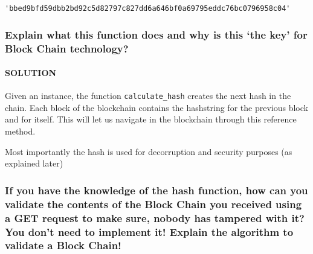\documentclass[11pt]{article}
\makeatletter
\newcommand{\boxspacing}{\kern\kvtcb@left@rule\kern\kvtcb@boxsep}
\newcommand{\prompt}[4]{
        {\ttfamily\llap{{\color{#2}[#3]:\hspace{3pt}#4}}\vspace{-\baselineskip}}
    }
\makeatother
\begin{document}
            \begin{tcolorbox}[breakable, size=fbox, boxrule=.5pt, pad at break*=1mm, opacityfill=0]
\prompt{Out}{outcolor}{35}{\boxspacing}
\begin{Verbatim}[commandchars=\\\{\}]
'bbed9bfd59dbb2bd92c5d82797c827dd6a646bf0a69795eddc76bc0796958c04'
\end{Verbatim}
\end{tcolorbox}
        
    \hypertarget{explain-what-this-function-does-and-why-is-this-the-key-for-block-chain-technology}{%
\subsubsection{Explain what this function does and why is this
`the key' for Block Chain
technology?}\label{explain-what-this-function-does-and-why-is-this-the-key-for-block-chain-technology}}

    \hypertarget{solution}{%
\paragraph{SOLUTION}\label{solution}}

Given an instance, the function \texttt{calculate\_hash} creates the
next hash in the chain. Each block of the blockchain contains the
hashstring for the previous block and for itself. This will let us
navigate in the blockchain through this reference method.

Most importantly the hash is used for decorruption and security purposes
(as explained later)

    \hypertarget{if-you-have-the-knowledge-of-the-hash-function-how-can-you-validate-the-contents-of-the-block-chain-you-received-using-a-get-request-to-make-sure-nobody-has-tampered-with-it-you-dont-need-to-implement-it-explain-the-algorithm-to-validate-a-block-chain}{%
\subsubsection{If you have the knowledge of the hash function, how
can you validate the contents of the Block Chain you received using a
GET request to make sure, nobody has tampered with it? You don't need to
implement it! Explain the algorithm to validate a Block
Chain!}\label{if-you-have-the-knowledge-of-the-hash-function-how-can-you-validate-the-contents-of-the-block-chain-you-received-using-a-get-request-to-make-sure-nobody-has-tampered-with-it-you-dont-need-to-implement-it-explain-the-algorithm-to-validate-a-block-chain}}
\end{document}
